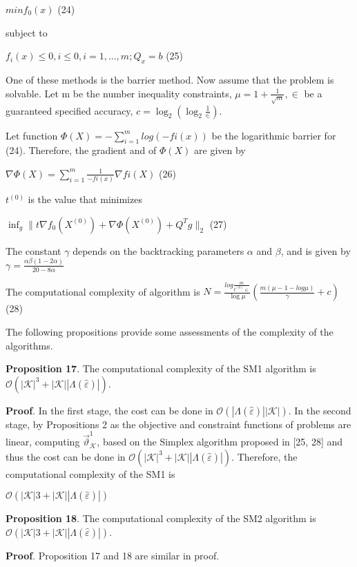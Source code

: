 \documentclass[]{iosart2c}
\begin{document}
$min f_0(x)$ (24)

subject to

$f_i(x) \le 0, i \le 0, i = 1, ...,m;Q_x = b$ (25)

One of these methods is the barrier method. Now assume that the problem is solvable. Let m be the number inequality constraints, $\mu = 1 + \frac{1}{\sqrt{m}}, \in$ be a 
guaranteed specified accuracy, $c = \log_2 (\log_2 \frac{1}{\in})$.

Let function $\Phi(X) = -\sum^m_{i=1} log(-fi(x))$ be the
logarithmic barrier for (24). Therefore, the gradient
and of $\Phi(X)$ are given by

$\nabla \Phi(X) = \sum^m_{i=1} \frac{1}{-fi(x)} \nabla fi(X)$ (26)

$t^{(0)}$ is the value that minimizes

$\inf_g \parallel t\nabla f_0 \left( X^{(0)} \right) + \nabla \Phi \left( X^{(0)} \right) + Q^T g \parallel _2$ (27)

The constant $\gamma$ depends on the backtracking
parameters $\alpha$ and $\beta$, and is given by $\gamma =  \frac{\alpha\beta(1-2\alpha)}{20-8\alpha}$

The computational complexity of algorithm is
$N = \frac{log \frac{m}{t^{(0)} \in}}{ \log\mu }
\left( \frac{m(\mu - 1 - log\mu)}{\gamma} + c \right)$ (28)

The following propositions provide some assessments of the complexity of the algorithms.

\textbf{Proposition 17}. The computational complexity of the
SM1 algorithm is $\mathcal{O}(|\mathcal{K}|^3 + |\mathcal{K}| |\Lambda(\hat{\varepsilon} )|)$.

\textbf{Proof}. In the first stage, the cost can be done in
$\mathcal{O}(|\Lambda(\hat{\varepsilon})| |\mathcal{K}|)$. In the second stage, by Propositions
2 as the objective and constraint functions of problems
are linear, computing $\vec{\vartheta}^1_\mathcal{K}$, based on the Simplex
algorithm proposed in [25, 28] and thus the cost can
be done in $\mathcal{O}(|\mathcal{K}|^3 + |\mathcal{K}| |\Lambda(\hat{\varepsilon})|)$. Therefore, the computational
complexity of the SM1 is

$\mathcal{O}(|\mathcal{K}|3 + |\mathcal{K}| |\Lambda(\hat{\varepsilon})|)$

\textbf{Proposition 18}. The computational complexity of the
SM2 algorithm is $\mathcal{O}(|\mathcal{K}|3 + |\mathcal{K}| |\Lambda(\hat{\varepsilon})|)$.

\textbf{Proof}. Proposition 17 and 18 are similar in proof.
\end{document}

